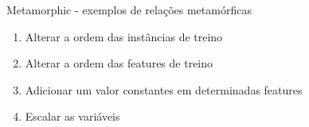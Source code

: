 \begin{frame}
	\begin{block}{Metamorphic - exemplos de relações metamórficas}
		\begin{enumerate}
			\item Alterar a ordem das instâncias de treino
			\item Alterar a ordem das features de treino
			\item Adicionar um valor constantes em determinadas features
			\item Escalar as variáveis
		\end{enumerate}
	\end{block}
\end{frame}
